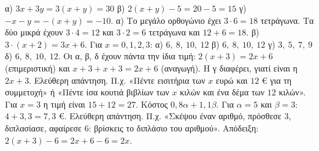  α) $3x+3y=3(x+y)=30$ \quad β) $2(x+y)-5=20-5=15$ \quad γ) $-x-y=-(x+y)=-10$.
 α) Το μεγάλο ορθογώνιο έχει $3\cdot6=18$ τετράγωνα. Τα δύο μικρά έχουν $3\cdot4=12$ και $3\cdot2=6$ τετράγωνα και $12+6=18$. \quad β) $3\cdot(x+2)=3x+6$.
 Για $x=0,1,2,3$: α) $6,\ 8,\ 10,\ 12$ \quad β) $6,\ 8,\ 10,\ 12$ \quad γ) $3,\ 5,\ 7,\ 9$ \quad δ) $6,\ 8,\ 10,\ 12$. Οι α, β, δ έχουν πάντα την ίδια τιμή: $2(x+3)=2x+6$ (επιμεριστική) και $x+3+x+3=2x+6$ (αναγωγή). Η γ διαφέρει, γιατί είναι η $2x+3$.
 Ελεύθερη απάντηση. Π.χ. «Πέντε εισιτήρια των $x$ ευρώ και $12$ € για τη συμμετοχή» ή «Πέντε ίσα κουτιά βιβλίων των $x$ κιλών και ένα δέμα των $12$ κιλών». Για $x=3$ η τιμή είναι $15+12=27$.
 Κόστος $0{,}8\alpha+1{,}1\beta$. Για $\alpha=5$ και $\beta=3$: $4+3{,}3=7{,}3$ €.
 Ελεύθερη απάντηση. Π.χ. «Σκέψου έναν αριθμό, πρόσθεσε $3$, διπλασίασε, αφαίρεσε $6$: βρίσκεις το διπλάσιο του αριθμού». Απόδειξη: $2(x+3)-6=2x+6-6=2x$.
